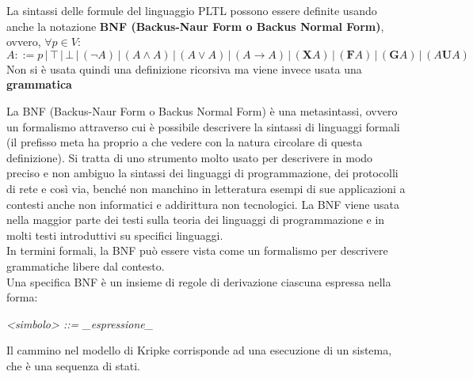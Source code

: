 \documentclass[a4paper,12pt, oneside]{book}
\begin{document}
\begin{definizione}
  La sintassi delle formule del linguaggio PLTL possono essere definite usando
  anche la notazione \textbf{BNF (Backus-Naur Form o Backus Normal Form)},
  ovvero, $\forall p\in V$:
  \[A::=p\,|\,\top\,|\,\bot\,|\,(\neg A)\,|\,(A\land A)\,|\,(A\lor A)\,|\,(A\to
    A)\,|\,(\mathbf{X}A)\,|\,(\mathbf{F}A)\,|\,(\mathbf{G}A)\,|\,(A\mathbf{U}A)
  \] 
  Non si è usata quindi una definizione ricorsiva ma viene invece usata una
  \textbf{grammatica}\\
  \begin{shaded}
    La BNF (Backus-Naur Form o Backus Normal Form) è una metasintassi, ovvero un
    formalismo attraverso cui è possibile descrivere la sintassi di linguaggi
    formali (il prefisso meta ha proprio a che vedere con la natura circolare di
    questa definizione). Si tratta di uno strumento molto usato per descrivere
    in modo preciso e non ambiguo la sintassi dei linguaggi di programmazione,
    dei protocolli di rete e così via, benché non manchino in letteratura esempi
    di sue applicazioni a contesti anche non informatici e addirittura non
    tecnologici. La BNF viene usata nella maggior parte dei testi sulla teoria
    dei linguaggi di programmazione e in molti testi introduttivi su specifici
    linguaggi. \\
    In termini formali, la BNF può essere vista come un formalismo per descrivere
    grammatiche libere dal contesto.  \\
    Una specifica BNF è un insieme di regole di derivazione ciascuna espressa
    nella forma: 
    \begin{center}
      \textit{<simbolo> ::= \_espressione\_}
    \end{center}
  \end{shaded}
\end{definizione}
Il cammino nel modello di Kripke corrisponde ad una esecuzione di un sistema,
che è una sequenza di stati. 
\end{document}
